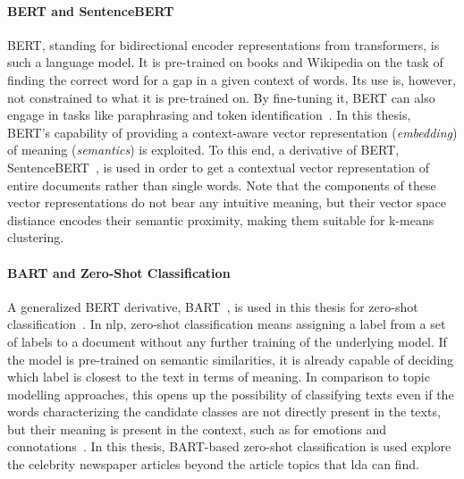 \paragraph{BERT and SentenceBERT}\label{ch:sentencebert}
BERT, standing for bidirectional encoder representations from transformers, is such a language model. It is pre-trained on books and Wikipedia on the task of finding the correct word for a gap in a given context of words. Its use is, however, not constrained to what it is pre-trained on. By fine-tuning it, BERT can also engage in tasks like paraphrasing and token identification~\autocite{devlin_bert_2019}. In this thesis, BERT's capability of providing a context-aware vector representation (\textit{embedding}) of meaning (\textit{semantics}) is exploited. To this end, a derivative of BERT, SentenceBERT~\autocite{reimers_sentence-bert_2019}, is used in order to get a contextual vector representation of entire documents rather than single words. Note that the components of these vector representations do not bear any intuitive meaning, but their vector space distiance encodes their semantic proximity, making them suitable for k-means clustering.

\paragraph{BART and Zero-Shot Classification}\label{ch:zero_shot}
A generalized BERT derivative, BART~\autocite{lewis_bart_2020}, is used in this thesis for zero-shot classification~\autocite{huggingfacebart-large-mnli_facebookbart-large-mnli_nodate,davison_zero-shot_2020}. In \gls{nlp}, zero-shot classification means assigning a label from a set of labels to a document without any further training of the underlying model. If the model is pre-trained on semantic similarities, it is already capable of deciding which label is closest to the text in terms of meaning. In comparison to topic modelling approaches, this opens up the possibility of classifying texts even if the words characterizing the candidate classes are not directly present in the texts, but their meaning is present in the context, such as for emotions and connotations~\autocite{yin_benchmarking_2019}. In this thesis, BART-based zero-shot classification is used explore the celebrity newspaper articles beyond the article topics that \gls{lda} can find.
